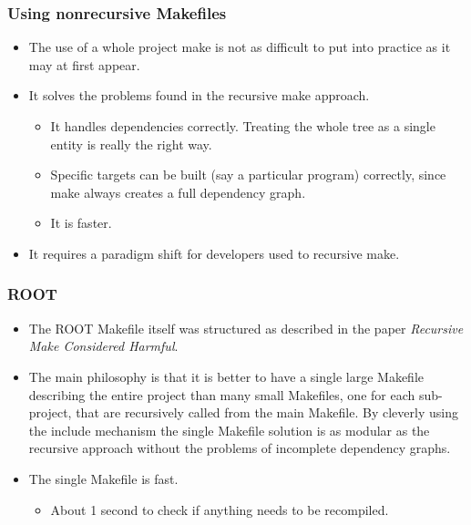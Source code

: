 \documentclass[11pt]{beamer}
\begin{document}

\begin{frame}
  \frametitle{Using nonrecursive Makefiles}
  \begin{itemize}
    \item<1-> The use of a whole project make is not as difficult to put into
      practice as it may at first appear.\\[5mm]
    \item<2-> It solves the problems found in the recursive make approach.

      \begin{itemize}[<3->]
      \item It handles dependencies correctly. Treating the whole tree as a
        single entity is really the right way.\\[1mm]
      \item Specific targets can be built (say a particular program)
        correctly, since make always creates a full dependency graph.\\[1mm]
      \item It is faster.\\[5mm]
      \end{itemize}
    \item<4> It requires a paradigm shift for developers used to recursive
      make.
  \end{itemize}
\end{frame}


\begin{frame}
  \frametitle{ROOT}
  \begin{itemize}
    \item The ROOT Makefile itself was structured as described in the paper
      \emph{Recursive Make Considered Harmful}.\\[5mm]
    \item The main philosophy is that it is better to have a single large
      Makefile describing the entire project than many small Makefiles, one
      for each sub-project, that are recursively called from the main
      Makefile. By cleverly using the include mechanism the single Makefile
      solution is as modular as the recursive approach without the problems of
      incomplete dependency graphs.\\[5mm]
    \item The single Makefile is fast.
      \begin{itemize}
        \item About 1 second to check if anything needs to be recompiled.
      \end{itemize}
  \end{itemize}
\end{frame}
\end{document}
